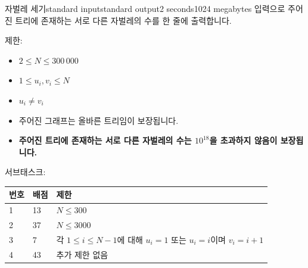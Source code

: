 \begin{problem}{자벌레 세기}{standard input}{standard output}{2 seconds}{1024 megabytes}
\OutputFile
입력으로 주어진 트리에 존재하는 서로 다른 자벌레의 수를 한 줄에 출력합니다.

\Scoring
제한:

\begin{itemize}
\item $2 \le N \le 300\,000$
\item $1 \le u_i,v_i \le N$
\item $u_i \neq v_i$
\item 주어진 그래프는 올바른 트리임이 보장됩니다.
\item \textbf{주어진 트리에 존재하는 서로 다른 자벌레의 수는 $10^{18}$을 초과하지 않음이 보장됩니다.}
\end{itemize}

서브태스크:

\begin{tabular}{|l|l|l|} \hline
  \textbf{번호} & \textbf{배점} & \textbf{제한} \\ \hline
  1 & 13 & $N \le 300$ \\ \hline
  2 & 37 & $N \le 3000$ \\ \hline
  3 & 7 & 각 $1 \le i \le N-1$에 대해 $u_i=1$ 또는 $u_i=i$이며 $v_i=i+1$ \\ \hline
  4 & 43 & 추가 제한 없음 \\ \hline
\end{tabular}

\Example

\begin{example}
%
\end{example}

\end{problem}

